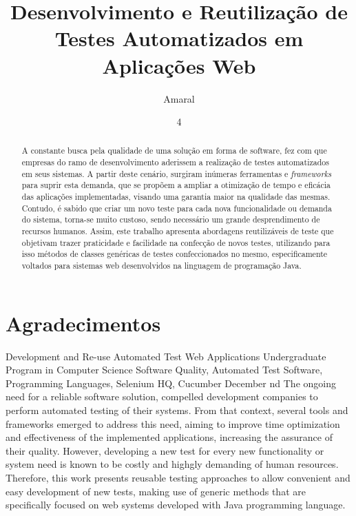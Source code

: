 \documentclass[tg]{mdtufsm}
\title{Desenvolvimento e Reutilização de Testes Automatizados em Aplicações Web}
\author{Amaral}{Lucas Antunes}
\institute{Centro de Tecnologia}
\date{4}{Dezembro}{2015}
\begin{document}
\maketitle
%

\chapter*{Agradecimentos}
\begin{abstract}
A constante busca pela qualidade de uma solução em forma de software, fez com que empresas do ramo de desenvolvimento aderissem a realização de testes automatizados em seus sistemas. A partir deste cenário,
surgiram inúmeras ferramentas e \emph{frameworks} para suprir esta demanda, que se propõem  a ampliar a otimização de tempo e eficácia das aplicações implementadas, visando uma garantia maior na qualidade das mesmas. Contudo, é sabido que criar um novo teste para cada nova funcionalidade ou demanda do sistema, torna-se muito custoso, sendo necessário um grande desprendimento de recursos humanos. Assim, este trabalho apresenta abordagens reutilizáveis de teste que objetivam trazer praticidade e facilidade na confecção de novos testes, utilizando para isso métodos de classes genéricas de testes confeccionados no mesmo, especificamente voltados para sistemas web desenvolvidos na linguagem de programação Java.
\end{abstract}

\begin{englishabstract}
{Development and Re-use Automated Test Web Applications}
{Undergraduate Program in Computer Science}
{Software Quality, Automated Test Software, Programming Languages, Selenium HQ, Cucumber}
{December}
{nd}
The ongoing need for a reliable software solution, compelled development companies to perform automated testing of their systems. From that context, several tools and frameworks emerged to address this need, aiming to improve time optimization and effectiveness of the implemented applications, increasing the assurance of their quality. However, developing a new test for every new functionality or system need is known to be costly and highgly demanding of human resources. Therefore, this work presents reusable testing approaches to allow convenient and easy development of new tests, making use of generic methods that are specifically focused on web systems developed with Java programming language.
\end{englishabstract}
\end{document}
